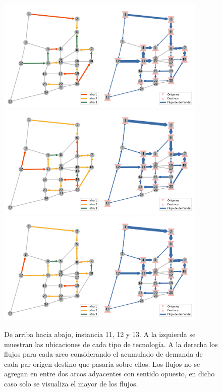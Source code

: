 \documentclass{article}
\begin{document}
  \begin{figure}[h!]
    \centering
    \includegraphics[width=10cm]{../resources/sioux_falls_0.4_budget_factor_linear_5_breakpoints.png}
    \includegraphics[width=10cm]{../resources/sioux_falls_0.4_budget_factor_linear_20_breakpoints.png}
    \includegraphics[width=10cm]{../resources/sioux_falls_0.4_budget_factor_linear_50_breakpoints.png}
    \caption{De arriba hacia abajo, instancia 11, 12 y 13. A la izquierda se muestran las ubicaciones de cada tipo de tecnología. A la derecha los flujos para cada arco considerando el acumulado de demanda de cada par origen-destino que pasaría sobre ellos. Los flujos no se agregan en entre dos arcos adyacentes con sentido opuesto, en dicho caso solo se visualiza el mayor de los flujos.}
    \label{fig:sensibilityinstance11_12_13}
  \end{figure}
\end{document}
